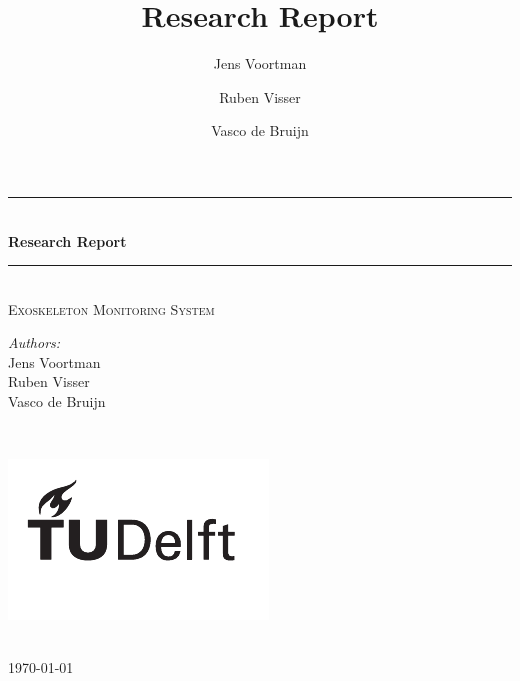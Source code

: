 \documentclass [a4paper,11pt]{article}
\title{Research Report}
\author{Jens Voortman \and Ruben Visser \and Vasco de Bruijn}
\begin{document}
\begin{titlepage}

\newcommand{\HRule}{\rule{\linewidth}{0.5mm}}
\centering

\HRule \\[0.4cm]
{ \huge \bfseries Research Report}\\ %
\HRule \\[0.5cm]

\textsc{\large Exoskeleton Monitoring System}\\[14.5cm]

\begin{minipage}{0.4\textwidth}
\begin{flushleft} \large
\emph{Authors:}\\
Jens Voortman\\
Ruben Visser\\
Vasco de Bruijn
\end{flushleft}
\end{minipage}
~
\begin{minipage}{0.4\textwidth}
\begin{flushright} \large
\includegraphics{logo_black}
\end{flushright}
\end{minipage}\\[2cm]

{\large \today}\\

\vfill
\end{titlepage}

\pagebreak
\tableofcontents
\pagebreak


\pagebreak

\pagebreak

\pagebreak

\pagebreak

\pagebreak

\pagebreak

\pagebreak

\pagebreak

\pagebreak

%
\end{document}

